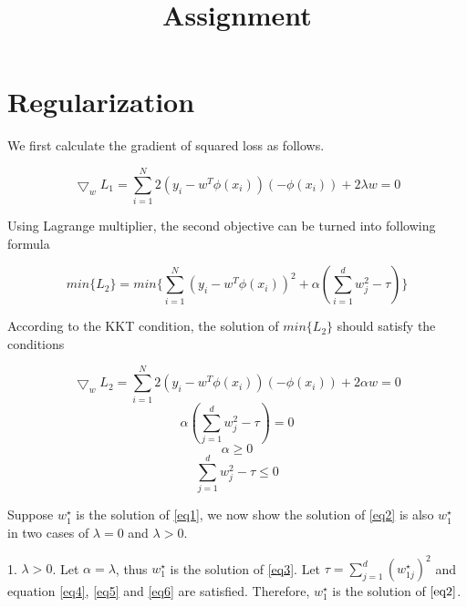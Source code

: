 \documentclass[10pt]{article}
\begin{document}
\title{Assignment}
\date{}

\maketitle

\section{Regularization}

  We first calculate the gradient of squared loss as follows.

\begin{equation}\label{eq1}
\bigtriangledown_{w}L_{1}=\displaystyle\sum_{i=1}^{N}2(y_{i}-w^{T}\phi(x_{i}))(-\phi(x_{i})) +2\lambda w = 0
\end{equation}

Using Lagrange multiplier, the second objective can be turned into following formula

\begin{equation}\label{eq2}
min\{L_{2}\} = min\{\displaystyle\sum_{i=1}^{N}(y_{i}-w^{T}\phi(x_{i}))^{2}+\alpha(\displaystyle\sum_{i=1}^{d}w_{j}^{2}-\tau)\}
\end{equation}

According to the KKT condition, the solution of $min\{L_{2}\}$ should satisfy the conditions 

\begin{equation}\label{eq3}
\bigtriangledown_{w}L_{2}=\displaystyle\sum_{i=1}^{N}2(y_{i}-w^{T}\phi(x_{i}))(-\phi(x_{i})) +2\alpha w = 0
\end{equation}
\begin{equation}\label{eq4}
\alpha(\displaystyle\sum_{j=1}^{d}w_{j}^{2}-\tau)=0
\end{equation}
\begin{equation}\label{eq5}
\alpha\geq 0
\end{equation}
\begin{equation}\label{eq6}
\displaystyle\sum_{j=1}^{d}w_{j}^{2}-\tau\leq 0
\end{equation}

Suppose $w^{\star}_{1}$ is the solution of \ref{eq1}, we now show the solution of \ref{eq2} is also $w^{\star}_{1}$ in two cases of $\lambda=0$ and $\lambda>0$.

1. $\lambda>0$. Let $\alpha=\lambda$, thus $w^{\star}_{1}$ is the solution of \ref{eq3}. Let $\tau=\displaystyle\sum_{j=1}^{d}(w^{\star}_{1j})^{2}$ and equation \ref{eq4}, \ref{eq5} and \ref{eq6} are satisfied. Therefore, $w^{\star}_{1}$ is the solution of $\ref{eq2}$.
\end{document}

